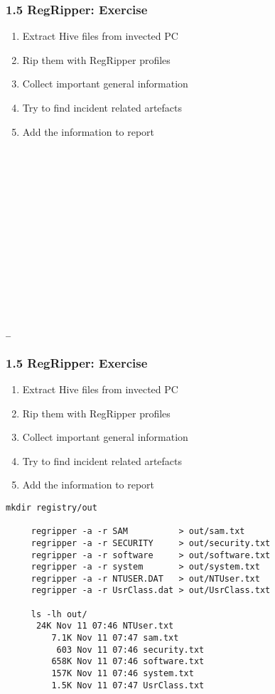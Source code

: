 \begin{frame}[fragile]
  \frametitle{1.5 RegRipper: Exercise}
  \begin{enumerate}
      \item Extract Hive files from invected PC
      \item Rip them with RegRipper profiles
      \item Collect important general information
      \item Try to find incident related artefacts
      \item Add the information to report
  \end{enumerate}
  \begin{lstlisting}[basicstyle=\tiny]















_
  \end{lstlisting}
\end{frame}


\begin{frame}[fragile]
  \frametitle{1.5 RegRipper: Exercise}
  \begin{enumerate}
      \item Extract Hive files from invected PC
      \item Rip them with RegRipper profiles
      \item Collect important general information
      \item Try to find incident related artefacts
      \item Add the information to report
  \end{enumerate}
  \begin{lstlisting}[basicstyle=\tiny]
mkdir registry/out

     regripper -a -r SAM          > out/sam.txt
     regripper -a -r SECURITY     > out/security.txt
     regripper -a -r software     > out/software.txt
     regripper -a -r system       > out/system.txt
     regripper -a -r NTUSER.DAT   > out/NTUser.txt
     regripper -a -r UsrClass.dat > out/UsrClass.txt

     ls -lh out/
	  24K Nov 11 07:46 NTUser.txt
         7.1K Nov 11 07:47 sam.txt
          603 Nov 11 07:46 security.txt
         658K Nov 11 07:46 software.txt
         157K Nov 11 07:46 system.txt
         1.5K Nov 11 07:47 UsrClass.txt
  \end{lstlisting}
\end{frame}


